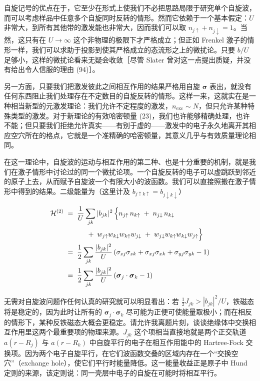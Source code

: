 自旋记号的优点在于，它至少在形式上使我们不必把思路局限于研究单个自旋波，而可以考虑样品中任意多个自旋同时反转的情形。然而它依赖于一个基本假定：$U$ 非常大，到所有其他带的激发能也非常大，因而我们可以取 $n_{j\uparrow} + n_{j\downarrow} = 1$。当然，这只有在 $U\to\infty$ 这个非物理的极限下才严格成立；但正如 Frenkel 激子的情形一样，我们可以求助于投影到使其严格成立的态流形之上的微扰论。只要 $b/U$ 足够小，这样的微扰论看来无疑会收敛［尽管 Slater 曾对这一点提出质疑，并没有给出令人信服的理由 (94)］。

另一方面，只要我们把激发彼此之间相互作用的结果严格用自旋 $\boldsymbol{\sigma}$ 表出，就没有任何东西阻止我们处理存在不定数目的自旋反转的情形。这样一来，这就实在是一种相当新型的元激发理论：我们允许不定程度的激发，$n_{\text{exc}}\sim N$，但只允许某种特殊类型的激发。对于新理论的有效哈密顿量 (23)，我们也许能够精确处理，也许不能；但只要我们拒绝允许真实——有别于虚的——激发中的电子永久地离开其相应空穴所在的格点，它就是一个准精确的哈密顿量，其意义几乎与有效质量理论相同。

在这一理论中，自旋波的运动与相互作用的第二种、也是十分重要的机制，就是我们在激子情形中讨论过的同一个微扰论项。一个自旋反转的电子可以虚跳跃到邻近的原子上去，从而赋予自旋波一个有限大小的波函数。我们可以直接照搬在激子情形中得到的结果。二级能量为（这里计及 $b_{j\uparrow k\uparrow} = b_{j\downarrow k\downarrow}$）

\begin{align*}
\mathcal{H}^{(2)} \;&=\; \frac{1}{U} \sum_{jk} |b_{jk}|^{2}\, \Bigl\{ n_{j\uparrow}\, n_{k\uparrow} \;+\; n_{j\downarrow}\, n_{k\downarrow} \\
&\qquad\quad +\; w_{j\uparrow} w_{k\downarrow} w_{k\uparrow} w_{j\downarrow} \;+\; w_{j\downarrow} w_{k\uparrow} w_{k\downarrow} w_{j\uparrow} \Bigr\} \\
&=\; \frac{1}{2} \sum_{jk} \frac{|b_{jk}|^{2}}{U}\left(\sigma_{zj}\sigma_{zk} + \sigma_{xj}\sigma_{xk} + \sigma_{yj}\sigma_{yk} - 1\right) \\
&=\; \frac{1}{2} \sum_{jk} \frac{|b_{jk}|^{2}}{U}\left(\boldsymbol{\sigma}_{j}\cdot\boldsymbol{\sigma}_{k} - 1\right)
\end{align*}

无需对自旋波问题作任何认真的研究就可以明显看出：若 $\frac{1}{2}J_{jk} > |b_{jk}|^{2}/U$，铁磁态将是稳定的，因为此时让所有的 $\boldsymbol{\sigma}_j\cdot\boldsymbol{\sigma}_k$ 尽可能为正便可使能量取极小；而在相反的情形下，某种反铁磁态大概会更稳定。请允许我离题片刻，谈谈绝缘体中交换相互作用里这两个最重要项的物理来源。$J_{jk}$ 这个项相当直接地就是两个正交轨道 $a(r-R_j)$ 与 $a(r-R_k)$ 中自旋平行的电子在相互作用能中的 Hartree-Fock 交换项。因为两个电子自旋平行，在它们波函数交叠的区域内存在一个“交换空穴”（exchange hole），使它们平行时能量降低。这一能量收益正是原子中 Hund 定则的来源，该定则说：同一壳层中电子的自旋在可能时将相互平行。

